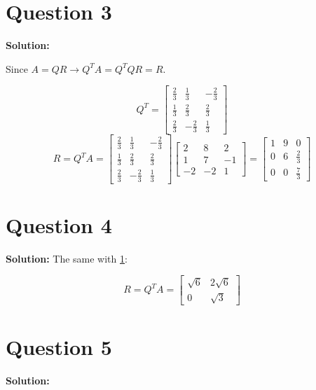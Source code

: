 \documentclass[11pt]{article} %
\begin{document}
\section{Question 3}\label{Ques}
\textbf{Solution:}

Since $A=QR \longrightarrow Q^{T}A=Q^{T}QR=R$.

$$Q^{T}=\begin{bmatrix}
	\frac{2}{3}&\frac{1}{3}&-\frac{2}{3}\\
	\frac{1}{3}&\frac{2}{3}&\frac{2}{3}\\
	\frac{2}{3}&-\frac{2}{3}&\frac{1}{3}
\end{bmatrix}$$
$$R=Q^{T}A=\begin{bmatrix}
	\frac{2}{3}&\frac{1}{3}&-\frac{2}{3}\\
	\frac{1}{3}&\frac{2}{3}&\frac{2}{3}\\
	\frac{2}{3}&-\frac{2}{3}&\frac{1}{3}
\end{bmatrix} 
\begin{bmatrix}
	2&8&2\\
	1&7&-1\\
	-2&-2&1
\end{bmatrix}=\begin{bmatrix}
1&9&0\\
0&6&\frac{2}{3}\\
0&0&\frac{7}{3}
\end{bmatrix}$$

\section{Question 4}
\textbf{Solution:}
The same with \ref{Ques}:

$$R=Q^{T}A=\begin{bmatrix}
	\sqrt{6}&2\sqrt{6}\\
	0&\sqrt{3}
\end{bmatrix}$$

\section{Question 5}
\textbf{Solution:}
\end{document}
